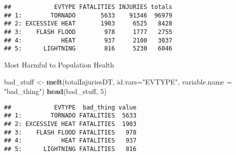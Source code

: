 \documentclass[]{article}
\newenvironment{Shaded}{\begin{snugshade}}{\end{snugshade}}
\newcommand{\DataTypeTok}[1]{\textcolor[rgb]{0.13,0.29,0.53}{#1}}
\newcommand{\DecValTok}[1]{\textcolor[rgb]{0.00,0.00,0.81}{#1}}
\newcommand{\KeywordTok}[1]{\textcolor[rgb]{0.13,0.29,0.53}{\textbf{#1}}}
\newcommand{\NormalTok}[1]{#1}
\newcommand{\StringTok}[1]{\textcolor[rgb]{0.31,0.60,0.02}{#1}}
\begin{document}
\begin{verbatim}
##            EVTYPE FATALITIES INJURIES totals
## 1:        TORNADO       5633    91346  96979
## 2: EXCESSIVE HEAT       1903     6525   8428
## 3:    FLASH FLOOD        978     1777   2755
## 4:           HEAT        937     2100   3037
## 5:      LIGHTNING        816     5230   6046
\end{verbatim}

Most Harmful to Population Health

\begin{Shaded}
\begin{Highlighting}[]
\NormalTok{bad_stuff <-}\StringTok{ }\KeywordTok{melt}\NormalTok{(totalInjuriesDT, }\DataTypeTok{id.vars=}\StringTok{"EVTYPE"}\NormalTok{, }\DataTypeTok{variable.name =} \StringTok{"bad_thing"}\NormalTok{)}
\KeywordTok{head}\NormalTok{(bad_stuff, }\DecValTok{5}\NormalTok{)}
\end{Highlighting}
\end{Shaded}

\begin{verbatim}
##            EVTYPE  bad_thing value
## 1:        TORNADO FATALITIES  5633
## 2: EXCESSIVE HEAT FATALITIES  1903
## 3:    FLASH FLOOD FATALITIES   978
## 4:           HEAT FATALITIES   937
## 5:      LIGHTNING FATALITIES   816
\end{verbatim}
\end{document}
